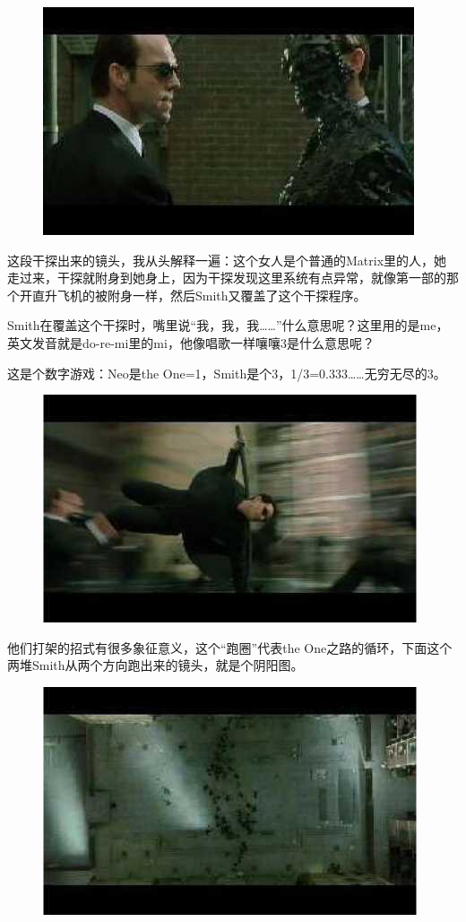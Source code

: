 \documentclass{ctexart}
\begin{document}
\begin{figure}[htb]
\centering
\includegraphics[width=0.5\linewidth]{fig/read_reloaded-75-1}
\end{figure}

这段干探出来的镜头，我从头解释一遍：这个女人是个普通的Matrix里的人，她走过来，干探就附身到她身上，因为干探发现这里系统有点异常，就像第一部的那个开直升飞机的被附身一样，然后Smith又覆盖了这个干探程序。

Smith在覆盖这个干探时，嘴里说“我，我，我……”什么意思呢？这里用的是me，英文发音就是do-re-mi里的mi，他像唱歌一样嚷嚷3是什么意思呢？

这是个数字游戏：Neo是the One=1，Smith是个3，1/3=0.333……无穷无尽的3。

\newpage

\begin{figure}[htb]
\centering
\includegraphics[width=0.5\linewidth]{fig/read_reloaded-77}
\end{figure}

他们打架的招式有很多象征意义，这个“跑圈”代表the One之路的循环，下面这个两堆Smith从两个方向跑出来的镜头，就是个阴阳图。

\begin{figure}[htb]
\centering
\includegraphics[width=0.5\linewidth]{fig/read_reloaded-78}
\end{figure}
\end{document}
